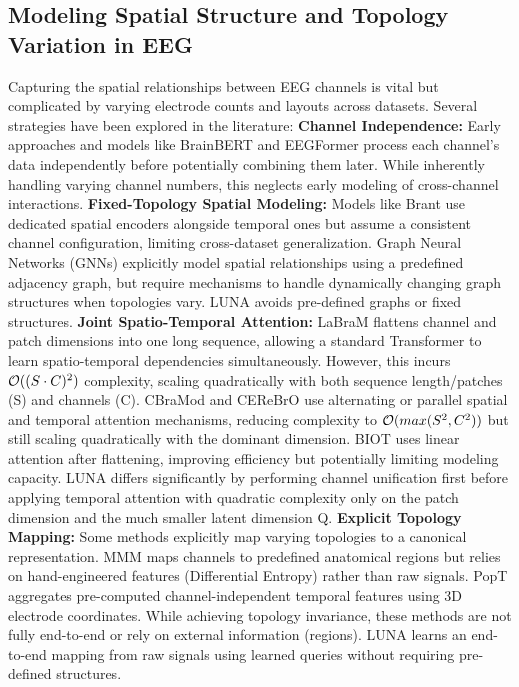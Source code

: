 \subsection{Modeling Spatial Structure and Topology Variation in EEG}
\label{subsec:related_work}
Capturing the spatial relationships between EEG channels is vital but complicated by varying electrode counts and layouts across datasets. Several strategies have been explored in the literature: \newline
\textbf{Channel Independence:} Early approaches and models like BrainBERT \citep{wang2023brainbert} and EEGFormer \citep{chen2024eegformer} process each channel's data independently before potentially combining them later. While inherently handling varying channel numbers, this neglects early modeling of cross-channel interactions. \newline
\textbf{Fixed-Topology Spatial Modeling:} Models like Brant \citep{zhang2023brant} use dedicated spatial encoders alongside temporal ones but assume a consistent channel configuration, limiting cross-dataset generalization. Graph Neural Networks (GNNs) \citep{tang2021self} explicitly model spatial relationships using a predefined adjacency graph, but require mechanisms to handle dynamically changing graph structures when topologies vary. LUNA avoids pre-defined graphs or fixed structures.  \newline
\textbf{Joint Spatio-Temporal Attention:} LaBraM \citep{jiang2024large} flattens channel and patch dimensions into one long sequence, allowing a standard Transformer to learn spatio-temporal dependencies simultaneously. However, this incurs $\mathcal{O}((S\cdot C)^2)$ complexity, scaling quadratically with both sequence length/patches (S) and channels (C). CBraMod \citep{wang2024cbramod} and CEReBrO \citep{dimofte2025cerebro} use alternating or parallel spatial and temporal attention mechanisms, reducing complexity to $\mathcal{O}(max(S^2, C^2))$ but still scaling quadratically with the dominant dimension. BIOT \citep{yang2023biot} uses linear attention after flattening, improving efficiency but potentially limiting modeling capacity. LUNA differs significantly by performing channel unification first before applying temporal attention with quadratic complexity only on the patch dimension and the much smaller latent dimension Q.  \newline
\textbf{Explicit Topology Mapping:} Some methods explicitly map varying topologies to a canonical representation. MMM \citep{yi2023learning} maps channels to predefined anatomical regions but relies on hand-engineered features (Differential Entropy) rather than raw signals. PopT \citep{chau2024population} aggregates pre-computed channel-independent temporal features using 3D electrode coordinates. While achieving topology invariance, these methods are not fully end-to-end or rely on external information (regions). LUNA learns an end-to-end mapping from raw signals using learned queries without requiring pre-defined structures.

